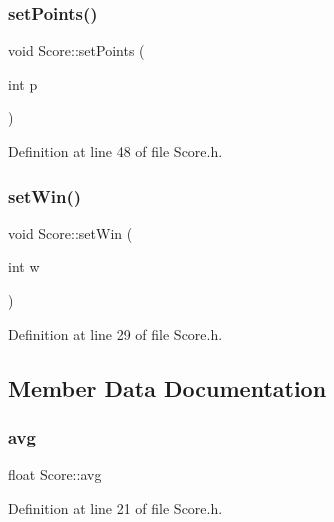\subsubsection{\texorpdfstring{set\+Points()}{setPoints()}}
{\footnotesize\ttfamily void Score\+::set\+Points (\begin{DoxyParamCaption}\item[{int}]{p }\end{DoxyParamCaption})\hspace{0.3cm}{\ttfamily [inline]}}



Definition at line 48 of file Score.\+h.

\hypertarget{class_score_a7960fbb8ef5c64918e56be6e256d5865}{}\label{class_score_a7960fbb8ef5c64918e56be6e256d5865} 
\subsubsection{\texorpdfstring{set\+Win()}{setWin()}}
{\footnotesize\ttfamily void Score\+::set\+Win (\begin{DoxyParamCaption}\item[{int}]{w }\end{DoxyParamCaption})\hspace{0.3cm}{\ttfamily [inline]}}



Definition at line 29 of file Score.\+h.



\subsection{Member Data Documentation}
\hypertarget{class_score_a64e012df968fcf3367cb6ecf02ed62a3}{}\label{class_score_a64e012df968fcf3367cb6ecf02ed62a3} 
\subsubsection{\texorpdfstring{avg}{avg}}
{\footnotesize\ttfamily float Score\+::avg\hspace{0.3cm}{\ttfamily [protected]}}



Definition at line 21 of file Score.\+h.

\hypertarget{class_score_a9076da395b3860d36f2a0e0e9c618b49}{}\label{class_score_a9076da395b3860d36f2a0e0e9c618b49} 
